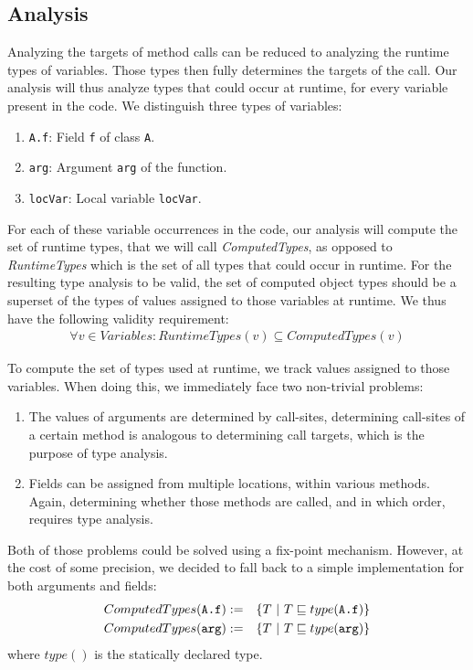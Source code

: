 \subsection{Analysis}
Analyzing the targets of method calls can be reduced to analyzing the runtime
types of variables. Those types then fully determines the targets of the call.
Our analysis will thus analyze types that could occur at runtime, for every
variable present in the code. We distinguish three types of variables:
\begin{enumerate}
    \item \lstinline{A.f}: Field \lstinline{f} of class \lstinline{A}.
    \item \lstinline{arg}: Argument \lstinline{arg} of the function.
    \item \lstinline{locVar}: Local variable \lstinline{locVar}.
\end{enumerate}

For each of these variable occurrences in the code, our analysis will compute
the set of runtime types, that we will call \emph{ComputedTypes}, as opposed to
\emph{RuntimeTypes} which is the set of all types that could occur in runtime.
For the resulting type analysis to be valid, the set of computed object types
should be a superset of the types of values assigned to those variables at
runtime.  We thus have the following validity requirement:
\begin{eqnarray*}
    \forall v \in Variables: RuntimeTypes(v) \subseteq ComputedTypes(v)
\end{eqnarray*}

To compute the set of types used at runtime, we track values assigned to those
variables. When doing this, we immediately face two non-trivial problems:
\begin{enumerate}
    \item The values of arguments are determined by call-sites, determining
    call-sites of a certain method is analogous to determining call targets,
    which is the purpose of type analysis.

    \item Fields can be assigned from multiple locations, within various
    methods. Again, determining whether those methods are
    called, and in which order, requires type analysis.
\end{enumerate}

Both of those problems could be solved using a fix-point mechanism. However, at
the cost of some precision, we decided to fall back to a simple implementation
for both arguments and fields:
\begin{eqnarray*}
    ComputedTypes(\verb/A.f/) &:=& \{ T ~|~ T \subtypeeq type(\verb/A.f/) \} \\
    ComputedTypes(\verb/arg/) &:=& \{ T ~|~ T \subtypeeq type(\verb/arg/) \} \\
\end{eqnarray*}
where $type()$ is the statically declared type.

